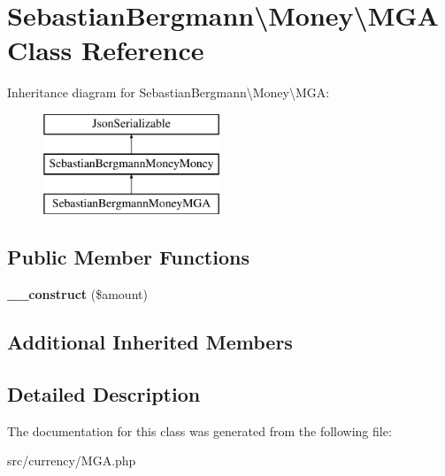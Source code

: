 \hypertarget{classSebastianBergmann_1_1Money_1_1MGA}{}\section{Sebastian\+Bergmann\textbackslash{}Money\textbackslash{}M\+G\+A Class Reference}
\label{classSebastianBergmann_1_1Money_1_1MGA}
Inheritance diagram for Sebastian\+Bergmann\textbackslash{}Money\textbackslash{}M\+G\+A\+:\begin{figure}[H]
\begin{center}
\leavevmode
\includegraphics[height=3.000000cm]{classSebastianBergmann_1_1Money_1_1MGA}
\end{center}
\end{figure}
\subsection*{Public Member Functions}
\begin{DoxyCompactItemize}
\item 
\hypertarget{classSebastianBergmann_1_1Money_1_1MGA_a3dfab6707ef4607efc957f92def46cdc}{}{\bfseries \+\_\+\+\_\+construct} (\$amount)\label{classSebastianBergmann_1_1Money_1_1MGA_a3dfab6707ef4607efc957f92def46cdc}

\end{DoxyCompactItemize}
\subsection*{Additional Inherited Members}


\subsection{Detailed Description}


The documentation for this class was generated from the following file\+:\begin{DoxyCompactItemize}
\item 
src/currency/M\+G\+A.\+php\end{DoxyCompactItemize}
